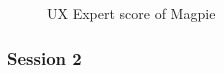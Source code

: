 \begin{figure}
    \centering
    \caption{UX Expert score of Magpie}
\end{figure}

\subsubsection{Session 2}